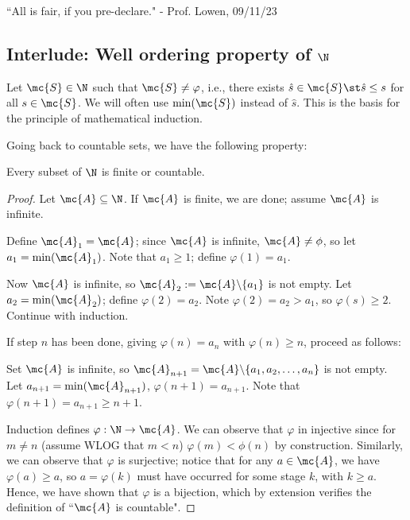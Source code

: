 \begin{nquote}{}
	``All is fair, if you pre-declare." - Prof. Lowen, 09/11/23
\end{nquote}

\subsection{Interlude: Well ordering property of \(\N\)}
Let \(\mc{S}\in \N\) such that \(\mc{S}\neq \varphi\), i.e., there exists \(\hat{s}\in \mc{S}\st\hat{s}\leq s\) for all \(s\in \mc{S}\). We will often use \(\operatorname{min}(\mc{S})\) instead of \(\hat{s}\). This is the basis for the principle of mathematical induction.

\bigskip

Going back to countable sets, we have the following property:
\begin{property}
	Every subset of \(\N\) is finite or countable.
\end{property}
\begin{proof}
	Let \(\mc{A}\subseteq\N\). If \(\mc{A}\) is finite, we are done; assume \(\mc{A}\) is infinite. 
	
	\medskip
	
	Define \(\mc{A}_1=\mc{A}\); since \(\mc{A}\) is infinite, \(\mc{A}\neq \phi\), so let \(a_1=\operatorname{min}(\mc{A}_1)\). Note that \(a_1\geq 1\); define \(\varphi(1)=a_1\).
	
	\medskip
	
	Now \(\mc{A}\) is infinite, so \(\mc{A}_2:=\mc{A}\backslash\{a_1\}\) is not empty. Let \(a_2=\operatorname{min}(\mc{A}_2)\); define \(\varphi(2)=a_2\). Note \(\varphi(2)=a_2>a_1\), so \(\varphi(s)\geq 2\). Continue with induction.
	
	\medskip
	
	If step \(n\) has been done, giving \(\varphi(n)=a_n\) with \(\varphi(n)\geq n\), proceed as follows:
	
	\medskip
	
	Set \(\mc{A}\) is infinite, so \(\mc{A}_{n+1}=\mc{A}\backslash\{a_1,a_2,\dots,a_n\}\) is not empty. Let \(a_{n+1}=\operatorname{min}(\mc{A}_{n+1})\), \(\varphi(n+1)=a_{n+1}\). Note that \(\varphi(n+1)=a_{n+1}\geq n+1\).
	
	\medskip
	
	Induction defines \(\varphi:\N\to \mc{A}\). We can observe that \(\varphi\) in injective since for \(m\neq n\) (assume WLOG that \(m<n\)) \(\varphi(m)<\phi(n)\) by construction.
	Similarly, we can observe that \(\varphi\) is surjective; notice that for any \(a\in \mc{A}\), we have \(\varphi(a)\geq a\), so \(a=\varphi(k)\) must have occurred for some stage \(k\), with \(k\geq a\). Hence, we have shown that \(\varphi\) is a bijection, which by extension verifies the definition of ``\(\mc{A}\) is countable".
\end{proof}

